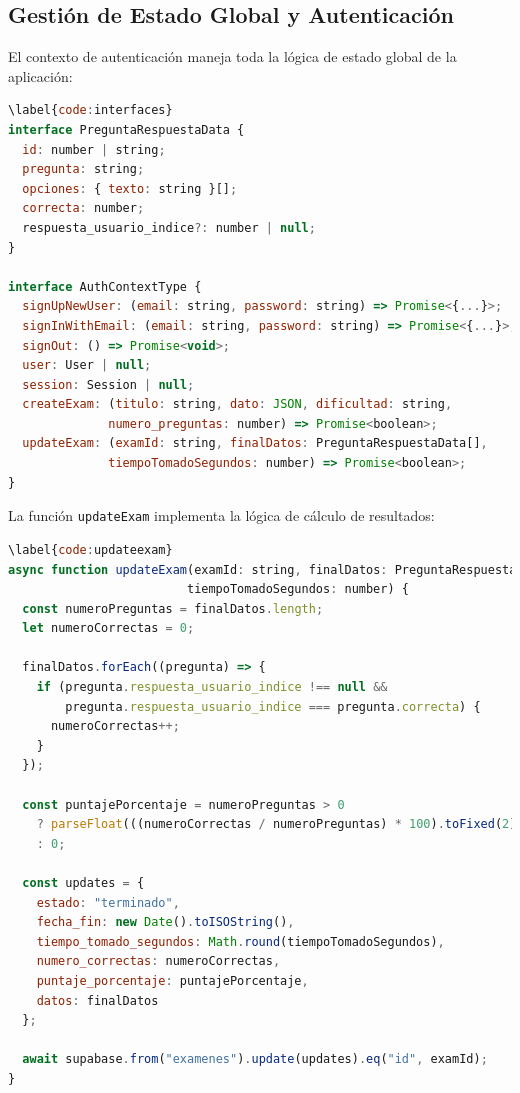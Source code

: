 \documentclass[12pt,a4paper]{report}
\begin{document}
\subsection{Gestión de Estado Global y Autenticación}

El contexto de autenticación maneja toda la lógica de estado global de la aplicación:

\begin{lstlisting}[language=JavaScript, caption={Código \ref{code:interfaces}: Interfaces de datos para preguntas}]
\label{code:interfaces}
interface PreguntaRespuestaData {
  id: number | string;
  pregunta: string;
  opciones: { texto: string }[];
  correcta: number;
  respuesta_usuario_indice?: number | null;
}

interface AuthContextType {
  signUpNewUser: (email: string, password: string) => Promise<{...}>;
  signInWithEmail: (email: string, password: string) => Promise<{...}>;
  signOut: () => Promise<void>;
  user: User | null;
  session: Session | null;
  createExam: (titulo: string, dato: JSON, dificultad: string, 
              numero_preguntas: number) => Promise<boolean>;
  updateExam: (examId: string, finalDatos: PreguntaRespuestaData[], 
              tiempoTomadoSegundos: number) => Promise<boolean>;
}
\end{lstlisting}

La función \texttt{updateExam} implementa la lógica de cálculo de resultados:

\begin{lstlisting}[language=JavaScript, caption={Código \ref{code:updateexam}: Algoritmo de cálculo de resultados}]
\label{code:updateexam}
async function updateExam(examId: string, finalDatos: PreguntaRespuestaData[], 
                         tiempoTomadoSegundos: number) {
  const numeroPreguntas = finalDatos.length;
  let numeroCorrectas = 0;

  finalDatos.forEach((pregunta) => {
    if (pregunta.respuesta_usuario_indice !== null &&
        pregunta.respuesta_usuario_indice === pregunta.correcta) {
      numeroCorrectas++;
    }
  });

  const puntajePorcentaje = numeroPreguntas > 0
    ? parseFloat(((numeroCorrectas / numeroPreguntas) * 100).toFixed(2))
    : 0;

  const updates = {
    estado: "terminado",
    fecha_fin: new Date().toISOString(),
    tiempo_tomado_segundos: Math.round(tiempoTomadoSegundos),
    numero_correctas: numeroCorrectas,
    puntaje_porcentaje: puntajePorcentaje,
    datos: finalDatos
  };

  await supabase.from("examenes").update(updates).eq("id", examId);
}
\end{lstlisting}
\end{document}
